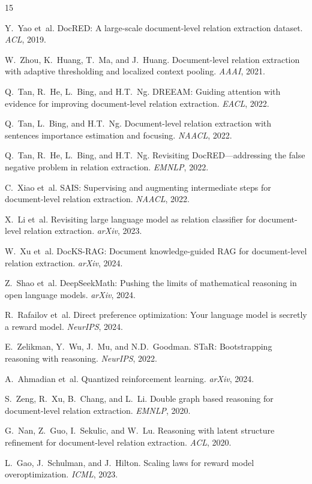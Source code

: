 \documentclass[11pt,a4paper]{article}
\begin{document}
\begin{thebibliography}{15}

Y.~Yao et~al.
DocRED: A large-scale document-level relation extraction dataset.
\emph{ACL}, 2019.

W.~Zhou, K.~Huang, T.~Ma, and J.~Huang.
Document-level relation extraction with adaptive thresholding and localized context pooling.
\emph{AAAI}, 2021.

Q.~Tan, R.~He, L.~Bing, and H.T.~Ng.
DREEAM: Guiding attention with evidence for improving document-level relation extraction.
\emph{EACL}, 2022.

Q.~Tan, L.~Bing, and H.T.~Ng.
Document-level relation extraction with sentences importance estimation and focusing.
\emph{NAACL}, 2022.

Q.~Tan, R.~He, L.~Bing, and H.T.~Ng.
Revisiting DocRED---addressing the false negative problem in relation extraction.
\emph{EMNLP}, 2022.

C.~Xiao et~al.
SAIS: Supervising and augmenting intermediate steps for document-level relation extraction.
\emph{NAACL}, 2022.

X.~Li et~al.
Revisiting large language model as relation classifier for document-level relation extraction.
\emph{arXiv}, 2023.

W.~Xu et~al.
DocKS-RAG: Document knowledge-guided RAG for document-level relation extraction.
\emph{arXiv}, 2024.

Z.~Shao et~al.
DeepSeekMath: Pushing the limits of mathematical reasoning in open language models.
\emph{arXiv}, 2024.

R.~Rafailov et~al.
Direct preference optimization: Your language model is secretly a reward model.
\emph{NeurIPS}, 2024.

E.~Zelikman, Y.~Wu, J.~Mu, and N.D.~Goodman.
STaR: Bootstrapping reasoning with reasoning.
\emph{NeurIPS}, 2022.

A.~Ahmadian et~al.
Quantized reinforcement learning.
\emph{arXiv}, 2024.

S.~Zeng, R.~Xu, B.~Chang, and L.~Li.
Double graph based reasoning for document-level relation extraction.
\emph{EMNLP}, 2020.

G.~Nan, Z.~Guo, I.~Sekulic, and W.~Lu.
Reasoning with latent structure refinement for document-level relation extraction.
\emph{ACL}, 2020.

L.~Gao, J.~Schulman, and J.~Hilton.
Scaling laws for reward model overoptimization.
\emph{ICML}, 2023.

\end{thebibliography}
\end{document}
